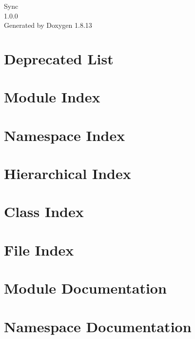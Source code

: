 \documentclass[twoside]{book}
\newcommand{\+}{\discretionary{\mbox{\scriptsize$\hookleftarrow$}}{}{}}
\newcommand{\clearemptydoublepage}{%
  \newpage{\pagestyle{empty}\cleardoublepage}%
}
\begin{document}
\hypersetup{pageanchor=false,
             bookmarksnumbered=true,
             pdfencoding=unicode
            }
\begin{titlepage}
\vspace*{7cm}
\begin{center}%
{\Large Sync \\[1ex]\large 1.\+0.\+0 }\\
\vspace*{1cm}
{\large Generated by Doxygen 1.8.13}\\
\end{center}
\end{titlepage}
\clearemptydoublepage
{}
\tableofcontents
\clearemptydoublepage
{}
\hypersetup{pageanchor=true}

\chapter{Deprecated List}
\label{deprecated}

\chapter{Module Index}

\chapter{Namespace Index}

\chapter{Hierarchical Index}

\chapter{Class Index}

\chapter{File Index}

\chapter{Module Documentation}





\chapter{Namespace Documentation}




\end{document}
